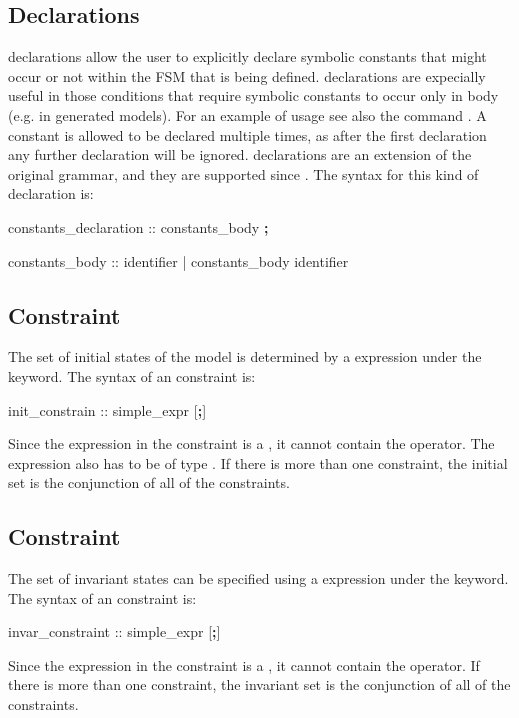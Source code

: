 \subsection{ Declarations}
\label{CONSTANTS Declarations}
%
 declarations allow the user to explicitly 
declare symbolic constants that might occur or not within the FSM that
is being defined. 
%
 declarations are expecially useful 
in those conditions that require symbolic constants to occur only
in  body (e.g. in generated models).
For an example of usage see also the command .
%
A constant is allowed to be declared multiple times, as after the
first declaration any further declaration will be ignored.
%
 declarations are an extension of the original 
\smv grammar, and they are supported since \NuSMV.
%
The syntax for this kind of declaration is:
%
\begin{Grammar}
constants_declaration ::  constants_body \textbf{;}

constants_body :: identifier 
             | constants_body  \operator{,} identifier
\end{Grammar}


\subsection{ Constraint}
\label{INIT Constraint}
%
The set of initial states of the model is determined by a \Boolean
expression under the  keyword.
%
The syntax of an  constraint is:
%
\begin{Grammar}
init_constrain ::  simple_expr [\textbf{;}]
\end{Grammar}
%
Since the expression in the  constraint is a
, it cannot contain the 
operator.
%
The expression also has to be of type \Boolean.
%
If there is more than one  constraint, the initial set is
the conjunction of all of the  constraints.

\subsection{ Constraint}
\label{INVAR Constraint}
%
The set of invariant states can be specified using a \Boolean
expression under the  keyword.
%
The syntax of an  constraint is:
%
\begin{Grammar}
invar_constraint ::  simple_expr [\textbf{;}]
\end{Grammar}
%
Since the expression in the  constraint is a
, it cannot contain the 
operator. 
%
If there is more than one  constraint, the invariant set
is the conjunction of all of the  constraints.

